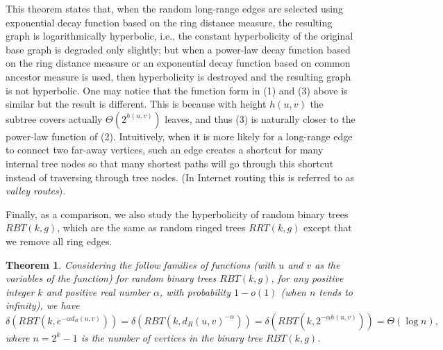 \documentclass[11pt]{article}
\newtheorem{thm}{Theorem}
\begin{document}

\noindent
This theorem states that,
when the random long-range edges are selected
	using exponential decay function based on the ring distance
	measure, the resulting graph
	is logarithmically hyperbolic, i.e., the constant hyperbolicity of
the original base graph is degraded only slightly;
but when a power-law decay function
	based on the ring distance measure or an exponential decay
	function based on common ancestor measure
	is used, then hyperbolicity is destroyed and the resulting graph is 
not hyperbolic.
One may notice that the function form in (1) and (3) above is similar
	but the result is different.
This is because with height $h(u,v)$ the subtree covers actually 
	$\Theta(2^{h(u,v)})$ leaves, and thus (3) is naturally closer to
	the power-law function of (2).
Intuitively, when it is more likely for a long-range edge 
	to connect two far-away vertices, such an edge 
	creates a shortcut for many internal tree nodes so that many shortest
	paths will go through this shortcut instead of traversing through
	tree nodes. (In Internet routing this is referred to as
	{\em valley routes}).

Finally, as a comparison, we also study the hyperbolicity of
	random binary trees $RBT(k,g)$, which are the same as
	random ringed trees $RRT(k,g)$ except that we remove all ring
	edges.

\begin{thm} \label{thm:randomRBT}
Considering the follow families of functions (with $u$ and $v$
	as the variables of the function) for random 
	binary trees $RBT(k,g)$, for any positive integer $k$ and
	positive real number $\alpha$, 
	with probability $1-o(1)$ (when $n$ tends to infinity), 
	we have
\[
\delta(RBT(k,e^{-\alpha d_R(u,v)}))=\delta(RBT(k,d_R(u,v)^{-\alpha}))=
	\delta(RBT(k,2^{-\alpha h(u,v)}))=\Theta(\log n),
\]
where $n=2^{k}-1$ is the number of
	vertices in the binary tree $RBT(k,g)$.
\end{thm}
\end{document}
